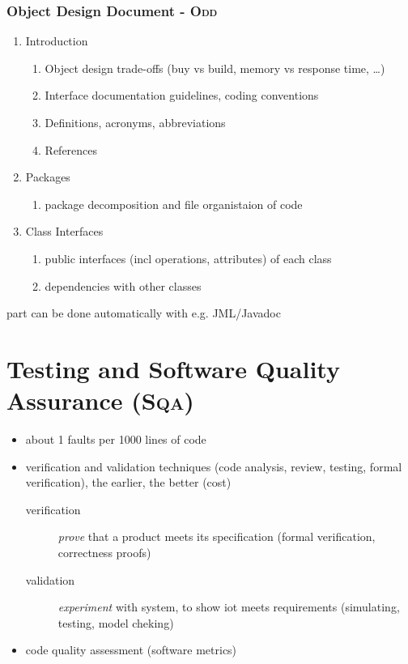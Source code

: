 \documentclass[a4paper, 10pt]{article}
\begin{document}
\subsubsection{Object Design Document - \textsc{Odd}}
\begin{enumerate}
	\item Introduction
	\begin{enumerate}
		\item Object design trade-offs (buy vs build, memory vs response time, \dots)
		\item Interface documentation guidelines, coding conventions
		\item Definitions, acronyms, abbreviations
		\item References
	\end{enumerate}
	\item Packages
	\begin{enumerate}
		\item package decomposition and file organistaion of code
	\end{enumerate}
	\item Class Interfaces
	\begin{enumerate}
		\item public interfaces (incl operations, attributes) of each class
		\item dependencies with other classes
	\end{enumerate}
\end{enumerate}
{\tiny part can be done automatically with e.g. JML/Javadoc}

\section{Testing and Software Quality Assurance (\textsc{Sqa})}
\begin{itemize}
	\item about 1 faults per 1000 lines of code
	\item verification and validation techniques (code analysis, review, testing, formal verification), the earlier, the better (cost)
	\begin{description}
		\item[verification] \emph{prove} that a product meets its specification (formal verification, correctness proofs)
		\item[validation] \emph{experiment} with system, to show iot meets requirements (simulating, testing, model cheking)
	\end{description}
	\item code quality assessment (software metrics)
\end{itemize}
\end{document}
